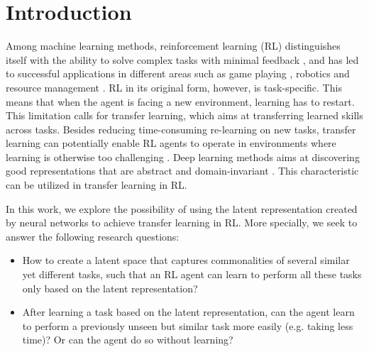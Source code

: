 \section{Introduction}
\label{sec:introduction}
Among machine learning methods, reinforcement learning (RL) distinguishes itself with the ability to solve complex tasks with minimal feedback \citep{taylor2007cross}, and has led to successful applications 
in different areas such as game playing \citep{silver2016mastering}, robotics \citep{levine2016end} and resource management \citep{mao2016resource}. 
RL in its original form, however, is task-specific.
This means that when the agent is facing a new environment, learning has to restart.
This limitation calls for transfer learning, which aims at transferring learned skills across tasks.
Besides reducing time-consuming re-learning on new tasks, transfer learning can potentially enable RL agents to operate in environments where learning is otherwise too challenging \citep{barreto2018transfer}.
Deep learning methods aims at discovering good representations that are abstract and domain-invariant \citep{bengio2012deep,ganin2014unsupervised}.
This characteristic can be utilized in transfer learning in RL.

In this work, we explore the possibility of using the latent representation created by neural networks to achieve transfer learning in RL.
More specially, we seek to answer the following research questions:
\begin{itemize}
	\item How to create a latent space that captures commonalities of several similar yet different tasks, such that an RL agent can learn to perform all these tasks only based on the latent representation?
	\item After learning a task based on the latent representation, can the agent learn to perform a previously unseen but similar task more easily (e.g. taking less time)? Or can the agent do so without learning?
\end{itemize}




